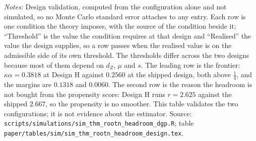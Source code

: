 \documentclass[
  12pt]{article}
\newcommand{\1}[1]{\mathds{1}\left[#1\right]}
\theoremstyle{plain}
\theoremstyle{definition}
\theoremstyle{definition}
\theoremstyle{remark}
\begin{document}
\begin{table}[!htbp]
\centering
\begin{threeparttable}
\caption{The two configurations, and the conditions each was built to satisfy}
\label{tab:supp-h-design}
\scriptsize
\setlength{\tabcolsep}{4pt}

\begin{tablenotes}\footnotesize
\item \textit{Notes:} Design validation, computed from the configuration alone
and not simulated, so no Monte Carlo standard error attaches to any entry. Each
row is one condition the theory imposes, with the source of the condition beside
it; ``Threshold'' is the value the condition requires at that design and
``Realised'' the value the design supplies, so a row passes when the realised
value is on the admissible side of its own threshold. The thresholds differ
across the two designs because most of them depend on $d_Z$, $\mu$ and $s$. The
leading row is the frontier: $\kappa\alpha=0.3818$ at Design H against
$0.2560$ at the shipped design, both above $\tfrac14$, and the margins are
$0.1318$ and $0.0060$. The second row is the reason the headroom is not bought
from the propensity score: Design H runs $r=2.625$ against the shipped $2.667$,
so the propensity is no smoother. This table validates the two configurations; it
is not evidence about the estimator. Source:
\texttt{scripts/simulations/sim\_thm\_rootn\_headroom\_dgp.R}; table
\texttt{paper/tables/sim/sim\_thm\_rootn\_headroom\_design.tex}.
\end{tablenotes}
\end{threeparttable}
\end{table}
\end{document}

